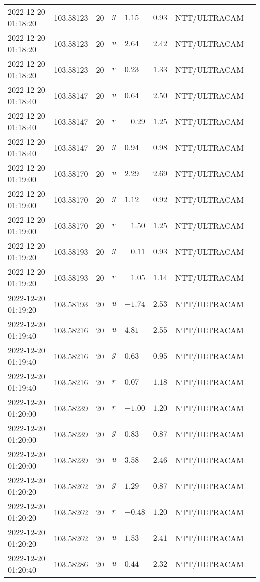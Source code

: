 \documentclass{nature_plusfigure}
\begin{document}
\begin{supplement}
\begin{center}
\begin{longtable}{llllllll}
2022-12-20 01:18:20 & 103.58123 & 20 & $g$ & $1.15$ & $0.93$ & NTT/ULTRACAM &  \\ 
2022-12-20 01:18:20 & 103.58123 & 20 & $u$ & $2.64$ & $2.42$ & NTT/ULTRACAM &  \\ 
2022-12-20 01:18:20 & 103.58123 & 20 & $r$ & $0.23$ & $1.33$ & NTT/ULTRACAM &  \\ 
2022-12-20 01:18:40 & 103.58147 & 20 & $u$ & $0.64$ & $2.50$ & NTT/ULTRACAM &  \\ 
2022-12-20 01:18:40 & 103.58147 & 20 & $r$ & $-0.29$ & $1.25$ & NTT/ULTRACAM &  \\ 
2022-12-20 01:18:40 & 103.58147 & 20 & $g$ & $0.94$ & $0.98$ & NTT/ULTRACAM &  \\ 
2022-12-20 01:19:00 & 103.58170 & 20 & $u$ & $2.29$ & $2.69$ & NTT/ULTRACAM &  \\ 
2022-12-20 01:19:00 & 103.58170 & 20 & $g$ & $1.12$ & $0.92$ & NTT/ULTRACAM &  \\ 
2022-12-20 01:19:00 & 103.58170 & 20 & $r$ & $-1.50$ & $1.25$ & NTT/ULTRACAM &  \\ 
2022-12-20 01:19:20 & 103.58193 & 20 & $g$ & $-0.11$ & $0.93$ & NTT/ULTRACAM &  \\ 
2022-12-20 01:19:20 & 103.58193 & 20 & $r$ & $-1.05$ & $1.14$ & NTT/ULTRACAM &  \\ 
2022-12-20 01:19:20 & 103.58193 & 20 & $u$ & $-1.74$ & $2.53$ & NTT/ULTRACAM &  \\ 
2022-12-20 01:19:40 & 103.58216 & 20 & $u$ & $4.81$ & $2.55$ & NTT/ULTRACAM &  \\ 
2022-12-20 01:19:40 & 103.58216 & 20 & $g$ & $0.63$ & $0.95$ & NTT/ULTRACAM &  \\ 
2022-12-20 01:19:40 & 103.58216 & 20 & $r$ & $0.07$ & $1.18$ & NTT/ULTRACAM &  \\ 
2022-12-20 01:20:00 & 103.58239 & 20 & $r$ & $-1.00$ & $1.20$ & NTT/ULTRACAM &  \\ 
2022-12-20 01:20:00 & 103.58239 & 20 & $g$ & $0.83$ & $0.87$ & NTT/ULTRACAM &  \\ 
2022-12-20 01:20:00 & 103.58239 & 20 & $u$ & $3.58$ & $2.46$ & NTT/ULTRACAM &  \\ 
2022-12-20 01:20:20 & 103.58262 & 20 & $g$ & $1.29$ & $0.87$ & NTT/ULTRACAM &  \\ 
2022-12-20 01:20:20 & 103.58262 & 20 & $r$ & $-0.48$ & $1.20$ & NTT/ULTRACAM &  \\ 
2022-12-20 01:20:20 & 103.58262 & 20 & $u$ & $1.53$ & $2.41$ & NTT/ULTRACAM &  \\ 
2022-12-20 01:20:40 & 103.58286 & 20 & $u$ & $0.44$ & $2.32$ & NTT/ULTRACAM &  \\ 

\end{longtable}
\end{center}
\end{supplement}
\end{document}
